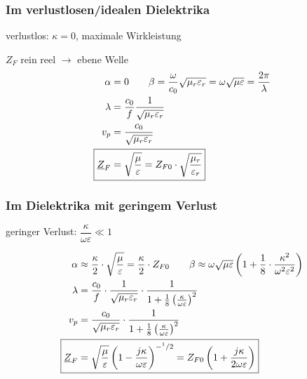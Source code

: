 \subsubsection{Im verlustlosen/idealen Dielektrika}
verlustlos: $\kappa =0$, maximale Wirkleistung

$Z_F$ rein reel $\rightarrow$ ebene Welle
\begin{align*}
    \alpha                  & = 0  \qquad \beta = \dfrac{\omega}{c_0}\sqrt{\mu_r\varepsilon_r}=\omega\sqrt{\mu\varepsilon}=\dfrac{2\pi}{\lambda} \\
    \lambda                 & = \dfrac{c_0}{f}\dfrac{1}{\sqrt{\mu_r\varepsilon_r}}                                             \\
    v_p                     & = \dfrac{c_0}{\sqrt{\mu_r\varepsilon_r}}                                                         \\
    \Aboxed{\underline{Z}_F & = \sqrt{\dfrac{\mu}{\varepsilon}} = Z_{F0} \cdot \sqrt{\dfrac{\mu_r}{\varepsilon_r}}}
\end{align*}

\subsubsection{Im Dielektrika mit geringem Verlust}
geringer Verlust: $\dfrac{\kappa}{\omega\varepsilon} \ll 1$

\begin{align*}
    \alpha                  & \approx\dfrac{\kappa}{2}\cdot\sqrt{\dfrac{\mu}{\varepsilon}} = \frac{\kappa}{2}\cdot Z_{F0}  \qquad \beta \approx\omega\sqrt{\mu\varepsilon}\left(1+\dfrac{1}{8}\cdot\dfrac{\kappa^2}{\omega^2\varepsilon^2}\right) \\
    \lambda                 & = \dfrac{c_0}{f}\cdot\dfrac{1}{\sqrt{\mu_r\varepsilon_r}}\cdot\frac{1}{1+\frac{1}{8}\left(\frac{\kappa}{\omega\varepsilon}\right)^2}                       \\
    v_p                     & = \dfrac{c_0}{\sqrt{\mu_r\varepsilon_r}}\cdot\frac{1}{1+\frac{1}{8}\left(\frac{\kappa}{\omega\varepsilon}\right)^2}                                        \\
    \Aboxed{\underline{Z}_F & = \sqrt{\dfrac{\mu}{\varepsilon}}\left(1-\frac{j\kappa}{\omega\varepsilon}\right)^{-^1/2} = Z_{F0}\left(1+\frac{j\kappa}{2\omega\varepsilon}\right)}
\end{align*}

